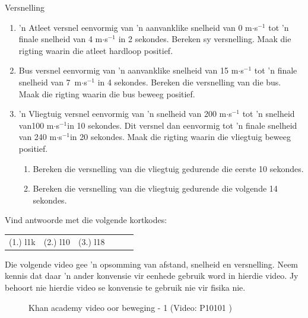 \begin{exercises}{Versnelling}
      
\noindent
\begin{enumerate}[noitemsep, label=\textbf{\arabic*}. ] 
    \item 'n Atleet versnel eenvormig van 'n aanvanklike snelheid van 0 m$\ensuremath{\cdot}$s${}^{-1}$ tot 'n finale snelheid van 4 m$\ensuremath{\cdot}$s${}^{-1}$ in 2 sekondes. Bereken sy versnelling. Maak die rigting waarin die atleet hardloop positief.    
    \item \n Bus versnel eenvormig van 'n aanvanklike snelheid van 15 m$\ensuremath{\cdot}$s${}^{-1}$ tot 'n finale snelheid van 7~m$\ensuremath{\cdot}$s${}^{-1}$ in 4 sekondes. Bereken die versnelling van die bus. Maak die rigting waarin die bus beweeg positief.

    \item 'n Vliegtuig versnel eenvormig van 'n snelheid van 200 m$\ensuremath{\cdot}$s${}^{-1}$ tot 'n snelheid van100 m$\ensuremath{\cdot}$s${}^{-1}$in 10 sekondes. Dit versnel dan eenvormig tot 'n finale snelheid van 240 m$\ensuremath{\cdot}$s${}^{-1}$in 20 sekondes. Maak die rigting waarin die vliegtuig beweeg positief.
 
    \begin{enumerate}[noitemsep, label=\textbf{\alph*}. ] 
            \item Bereken die versnelling van die vliegtuig gedurende die eerste 10 sekondes.
            \item Bereken die versnelling van die vliegtuig gedurende die volgende 14 sekondes.
    \end{enumerate}
\end{enumerate}
\par {} Vind antwoorde met die volgende kortkodes:
\par \begin{tabular}[h]{cccccc}
(1.) l1k  &  (2.) l10  &  (3.) l18  & \end{tabular}
\end{exercises}

Die volgende video gee 'n opsomming van afstand, snelheid en versnelling. Neem kennis dat daar 'n ander konvensie vir eenhede gebruik word in hierdie video. Jy behoort nie hierdie video se konvensie te gebruik nie vir fisika nie.
	\begin{figure}[H] %
    \textnormal{Khan academy video oor beweging - 1} \nopagebreak
  \label{m38794*yt-media1}\label{m38794*yt-video1}
             { (Video:  P10101 )}
 \end{figure}       \par 
\nopagebreak


